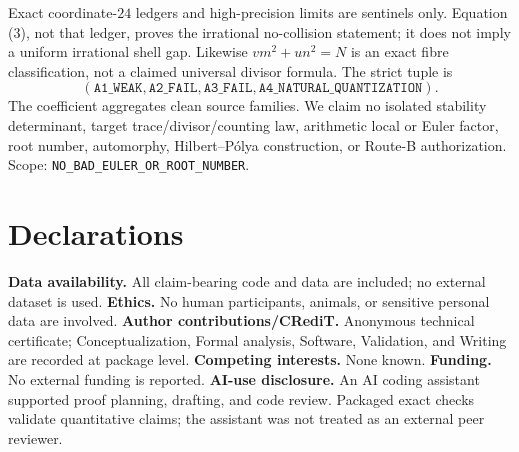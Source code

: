 \documentclass[10pt]{article}
\begin{document}
Exact coordinate-$24$ ledgers and high-precision limits are sentinels only.
Equation (3), not that ledger, proves the irrational no-collision statement;
it does not imply a uniform irrational shell gap.  Likewise
$vm^2+un^2=N$ is an exact fibre classification, not a claimed universal
divisor formula.
The strict tuple is
\[
(\texttt{A1\_WEAK},\texttt{A2\_FAIL},\texttt{A3\_FAIL},
 \texttt{A4\_NATURAL\_QUANTIZATION}). \tag{6}
\]
The coefficient aggregates clean source families.  We claim no isolated
stability determinant, target trace/divisor/counting law, arithmetic local or
Euler factor, root number, automorphy, Hilbert--P\'olya construction, or
Route-B authorization.  Scope: \texttt{NO\_BAD\_EULER\_OR\_ROOT\_NUMBER}.

\section*{Declarations}
\textbf{Data availability.} All claim-bearing code and data are included; no
external dataset is used.  \textbf{Ethics.} No human participants, animals,
or sensitive personal data are involved.  \textbf{Author contributions/CRediT.}
Anonymous technical certificate; Conceptualization, Formal analysis, Software,
Validation, and Writing are recorded at package level.  \textbf{Competing
interests.} None known.  \textbf{Funding.} No external funding is reported.
\textbf{AI-use disclosure.} An AI coding assistant supported proof planning,
drafting, and code review.  Packaged exact checks validate quantitative
claims; the assistant was not treated as an external peer reviewer.
\end{document}
